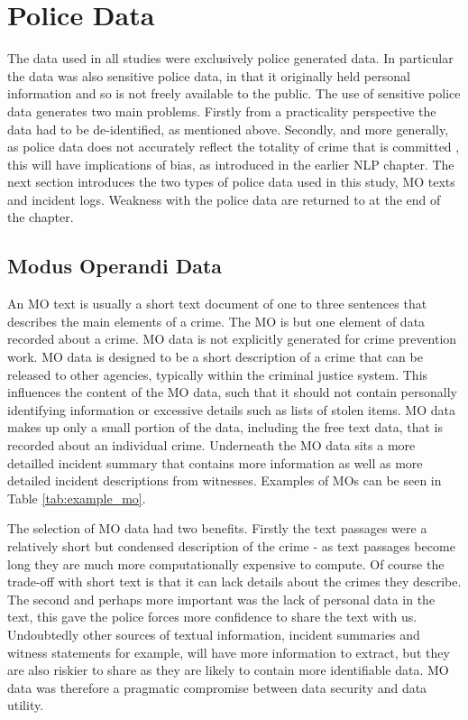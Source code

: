 \section{Police Data} The data used in all studies were exclusively police generated data. In particular the data was also sensitive police data, in that it originally held personal information and so is not freely available to the public. The use of sensitive police data generates two main problems. Firstly from a practicality perspective the data had to be de-identified, as mentioned above. Secondly, and more generally,  as police data does not accurately reflect the totality of crime that is committed \parencite{Tarling}, this will have implications of bias, as introduced in the earlier NLP chapter. The next section introduces the two types of police data used in this study, MO texts and incident logs. Weakness with the police data are returned to at the end of the chapter.


\subsection{Modus Operandi Data} An MO text is usually a short text document of one to three sentences that describes the main elements of a crime. The MO is but one element of data recorded about a crime. MO data is not explicitly generated for crime prevention work. MO data is designed to be a short description of a crime that can be released to other agencies, typically within the criminal justice system. This influences the content of the MO data, such that it should not contain personally identifying information or excessive details such as lists of stolen items. MO data makes up only a small portion of the data, including the free text data, that is recorded about an individual crime. Underneath the MO data sits a more detailled incident summary that contains more information as well as more detailed incident descriptions from witnesses.  Examples of MOs can be seen in Table \ref{tab:example_mo}.

The selection of MO data had two benefits. Firstly the text passages were a relatively short but condensed description of the crime - as text passages become long they are much more computationally expensive to compute. Of course the trade-off with short text is that it can lack details about the crimes they describe.  The second and perhaps more important was the lack of personal data in the text, this gave the police forces more confidence to share the text with us. Undoubtedly other sources of textual information, incident summaries and witness statements for example, will have more information to extract, but they are also riskier to share as they are likely to contain more identifiable data. MO data was therefore a pragmatic compromise between data security and data utility.


